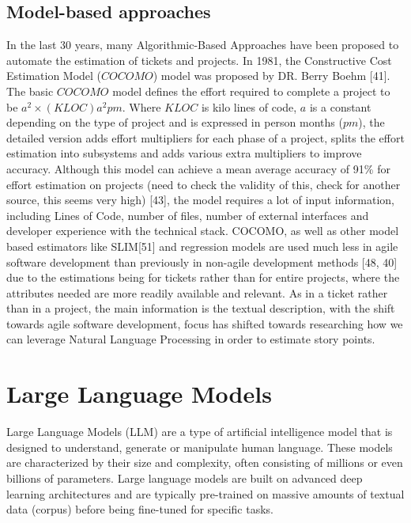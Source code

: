\documentclass{UoYCSproject}
\begin{document}
    \subsection{Model-based approaches}\label{subsec:model-based-approaches}
    In the last 30 years, many Algorithmic-Based Approaches have been proposed to automate the estimation of tickets
    and projects.
    In 1981, the Constructive Cost Estimation Model ($COCOMO$) model was proposed by DR. Berry Boehm [41].
    The basic $COCOMO$ model defines the effort required to complete a project to be $a^2 \times (KLOC)a^2pm$.
    Where $KLOC$ is kilo lines of code, $a$ is a constant depending on the type of project and is expressed in person months ($pm$), the detailed version adds effort multipliers for each phase of a project, splits the effort estimation into subsystems and adds various extra multipliers to improve accuracy.
    Although this model can achieve a mean average accuracy of 91\% for effort estimation on projects (need to check the validity of this, check for another source, this seems very high) [43], the model requires a lot of input information, including Lines of Code, number of files, number of external interfaces and developer experience with the technical stack.
    COCOMO, as well as other model based estimators like SLIM[51] and regression models are used much less in agile software development than previously in non-agile development methods [48, 40] due to the estimations being for tickets rather than for entire projects, where the attributes needed are more readily available and relevant.
    As in a ticket rather than in a project, the main information is the textual description, with the shift towards agile software development, focus has shifted towards researching how we can leverage Natural Language Processing in order to estimate story points.


    \section{Large Language Models}
    \label{sec:large-language-models}
    Large Language Models (LLM) are a type of artificial intelligence model that is designed to understand, generate
    or manipulate human language.
    These models are characterized by their size and complexity, often consisting of millions or even billions of parameters.
    Large language models are built on advanced deep learning architectures and are typically pre-trained on massive amounts of textual data (corpus) before being fine-tuned for specific tasks. \par
\end{document}
